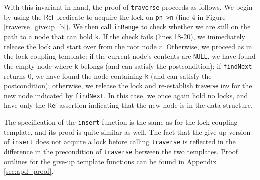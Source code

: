 \documentclass[sigplan,10pt, screen]{acmart}
\newcommand{\infp}{\ensuremath{\mathsf{Ref }}}
\begin{document}
With this invariant in hand, the proof of \texttt{traverse} proceeds as follows. We begin by using the $\infp$ predicate to acquire the lock on \lstinline{pn->n} (line 4 in Figure \ref{traverse_giveup_b}). We then call \lstinline{inRange} to check whether we are still on the path to a node that can hold \lstinline{k}. If the check fails (lines 18-20), we immediately release the lock and start over from the root node $r$. Otherwise, we proceed as in the lock-coupling template: if the current node's contents are \texttt{NULL}, we have found the empty node where \texttt{k} belongs (and can satisfy the postcondition); if \texttt{findNext} returns 0, we have found the node containing \texttt{k} (and can satisfy the postcondition); otherwise, we release the lock and re-establish $\mathsf{traverse\_inv}$ for the new node indicated by \texttt{findNext}. In this case, we once again hold no locks, and have only the $\infp$ assertion indicating that the new node is in the data structure. %



The specification of the \lstinline{insert} function is the same as for the lock-coupling template, and its proof is quite similar as well. The fact that the give-up version of \lstinline{insert} does not acquire a lock before calling \lstinline{traverse} is reflected in the difference in the precondition of \lstinline{traverse} between the two templates. Proof outlines for the give-up template functions can be found in Appendix \ref{sec:apd_proof}.
\end{document}
